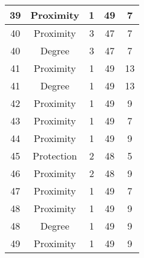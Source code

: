 \documentclass[results.tex]{subfiles}
\begin{document}
\begin{center}
\begin{tabular}{| c || c | c | c | c |}
    \hline
    39 & Proximity & 1 & 49 & 7 \\ 
    \hline
    40 & Proximity & 3 & 47 & 7 \\ 
    \hline
    40 & Degree & 3 & 47 & 7 \\ 
    \hline
    41 & Proximity & 1 & 49 & 13 \\ 
    \hline
    41 & Degree & 1 & 49 & 13 \\ 
    \hline
    42 & Proximity & 1 & 49 & 9 \\ 
    \hline
    43 & Proximity & 1 & 49 & 7 \\ 
    \hline
    44 & Proximity & 1 & 49 & 9 \\ 
    \hline
    45 & Protection & 2 & 48 & 5 \\ 
    \hline
    46 & Proximity & 2 & 48 & 9 \\ 
    \hline
    47 & Proximity & 1 & 49 & 7 \\ 
    \hline
    48 & Proximity & 1 & 49 & 9 \\ 
    \hline
    48 & Degree & 1 & 49 & 9 \\ 
    \hline
    49 & Proximity & 1 & 49 & 9 \\ 
    \hline   \end{tabular}
\end{center}
\end{document}
